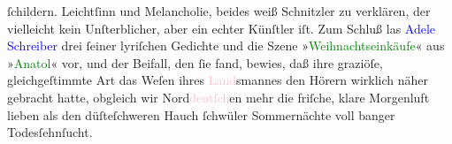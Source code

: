 {{                  ſchildern. Leichtſinn und Melancholie, beides weiß Schnitzler zu verklären, der
                  vielleicht kein Unſterblicher, aber ein echter Künſtler iſt. Zum Schluß las \textcolor{blue}{Adele Schreiber}{}\ledrightnote{\textcolor{blue}{Adele Schreiber}} drei ſeiner lyriſchen
                  Gedichte und die Szene »\textcolor{green}{Weihnachtseinkäufe}{}\ledrightnote{\textcolor{green}{Weihnachts-Einkäufe}}«
                  aus »\textcolor{green}{Anatol}{}\ledrightnote{\textcolor{green}{Anatol}}« vor, und der Beifall, den ſie
                  fand, bewies, daß ihre graziöſe, gleichgeſtimmte Art das Weſen ihres \textcolor{pink}{Land}{}\ledrightnote{{$\rightarrow$}\textcolor{pink}{Österreich}}smannes den Hörern
                  wirklich näher gebracht hatte, obgleich wir Nord\textcolor{pink}{deutſch}{}\ledrightnote{{$\rightarrow$}\textcolor{pink}{Deutschland}}en mehr die friſche, klare Morgenluft lieben als den
                  düſteſchweren Hauch ſchwüler Sommernächte voll banger Todesſehnſucht.}}\pend
           \endnumbering{}  
      